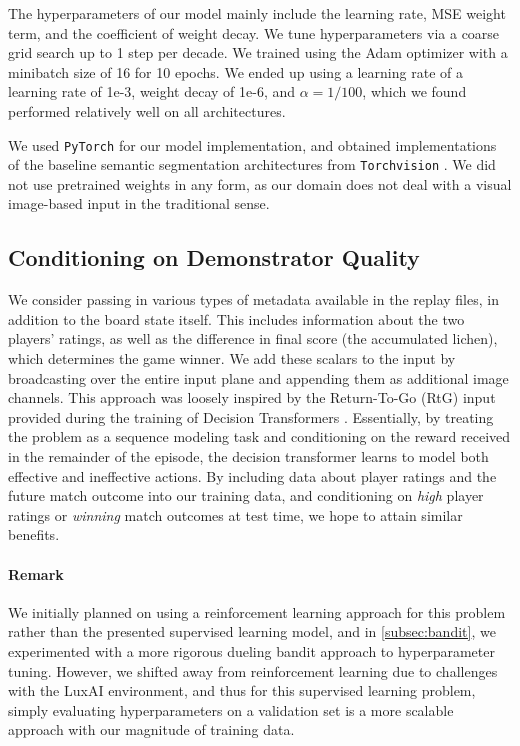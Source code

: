 \documentclass[10pt,twocolumn,letterpaper]{article}
\begin{document}
The hyperparameters of our model mainly include the learning
rate, MSE weight term, and the coefficient of weight decay.
We tune hyperparameters via a coarse grid search up to 1 step per decade.
We trained using the Adam optimizer with a minibatch size of 16 for 10 epochs.
We ended up using a learning rate of a learning rate of
1e-3, weight decay of 1e-6, and $\alpha=1/100$, which we
found performed relatively well on all architectures.

We used \texttt{PyTorch} \cite{paszke2019pytorch} for our model implementation,
and obtained implementations of the baseline semantic segmentation
architectures from \texttt{Torchvision} \cite{maintainers2016torchvision}.
We did not use pretrained weights in any form, as our domain does
not deal with a visual image-based input in the traditional sense.

\subsection{Conditioning on Demonstrator Quality}
\label{sec:metadata}

We consider passing in various types of metadata available
in the replay files, in addition to the board state itself.
This includes information
about the two players' ratings, as well as the difference in final
score (the accumulated lichen), which determines the game winner.
We add these scalars to the input by broadcasting over the entire
input plane and appending them as additional image channels.
This approach was loosely inspired by the Return-To-Go (RtG) input provided
during the training of Decision Transformers \cite{decision_transformers}.
Essentially, by treating the problem as a sequence modeling task and
conditioning on the reward received in the remainder of the episode, the
decision transformer learns to model both effective and ineffective actions.
By including data about player ratings and the future match outcome into
our training data, and conditioning on \emph{high} player ratings or
\emph{winning} match outcomes at test time, we hope to attain similar benefits.

\paragraph{Remark}

We initially planned on using a reinforcement learning approach for
this problem rather than the presented supervised learning model,
and in \autoref{subsec:bandit}, we experimented with a more rigorous
dueling bandit approach to hyperparameter tuning.
However, we shifted away from reinforcement learning due to challenges with
the LuxAI environment, and thus for this supervised learning problem, simply
evaluating hyperparameters on a validation set is a more scalable approach
with our magnitude of training data.
\end{document}
